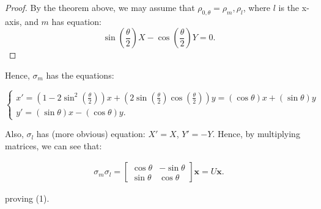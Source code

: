 \begin{proof}
  By the theorem above, we may assume that \( \rho_{0,\theta} = \rho_{m}, \rho_{l} \), where
  \( l \) is the x-axis, and \( m \) has equation:
  \[
    \sin \left( \frac{\theta}{2} \right)X - \cos \left( \frac{\theta}{2} \right)Y = 0
  .\] 
\end{proof}
Hence, \( \sigma_{m} \) has the equations:

\begin{equation*}
    \begin{cases}
      x' = \left(1 - 2 \sin^2(\frac{\theta}{2})  \right)x + \left(2\sin \left(\frac{\theta}{2}  \right) \cos \left(\frac{\theta}{2}  \right)  \right)y= \left( \cos \theta  \right) x + \left( \sin \theta  \right)y \\
      y' = \left( \sin \theta  \right)x - \left( \cos \theta  \right)y.
    \end{cases}
\end{equation*}

Also, \( \sigma_{l} \) has (more obvious) equation: \( X' = X \), \( Y' = -Y\).
Hence, by multiplying matrices, we can see that:

\begin{align*}
  \sigma_{m}\sigma_{l} = \begin{bmatrix} \cos \theta & - \sin \theta \\ \sin \theta & \cos \theta  \end{bmatrix} \mathbf{x} = U \mathbf{x}
.\end{align*}

proving (1).




